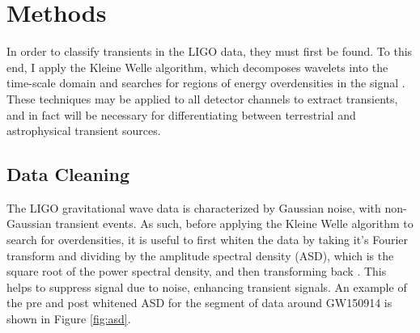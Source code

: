 \documentclass{article}
\begin{document}
\section{Methods}
In order to classify transients in the LIGO data, they must first be found. To this end, I apply the Kleine Welle algorithm, which decomposes wavelets into the time-scale domain and searches for regions of energy overdensities in the signal \cite{Biswas2013}\cite{Blackburn2007}. These techniques may be applied to all detector channels to extract transients, and in fact will be necessary for differentiating between terrestrial and astrophysical transient sources.

\subsection{Data Cleaning}
The LIGO gravitational wave data is characterized by Gaussian noise, with non-Gaussian transient events. As such, before applying the Kleine Welle algorithm to search for overdensities, it is useful to first whiten the data by taking it's Fourier transform and dividing by the amplitude spectral density (ASD), which is the square root of the power spectral density, and then transforming back \cite{LIGOScientificCollaboration}. This helps to suppress signal due to noise, enhancing transient signals. An example of the pre and post whitened ASD for the segment of data around GW150914 is shown in Figure \ref{fig:asd}.
\end{document}
